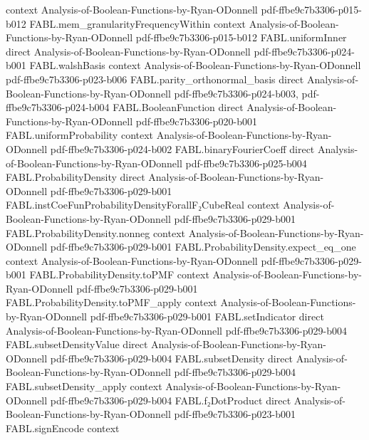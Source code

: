 \begin{theorem}
  {context}
  {Analysis-of-Boolean-Functions-by-Ryan-ODonnell}
  {pdf-ffbe9c7b3306-p015-b012}
\proofstep
  {FABL.mem_granularityFrequencyWithin}
  {context}
  {Analysis-of-Boolean-Functions-by-Ryan-ODonnell}
  {pdf-ffbe9c7b3306-p015-b012}
\proofstep
  {FABL.uniformInner}
  {direct}
  {Analysis-of-Boolean-Functions-by-Ryan-ODonnell}
  {pdf-ffbe9c7b3306-p024-b001}
\proofstep
  {FABL.walshBasis}
  {context}
  {Analysis-of-Boolean-Functions-by-Ryan-ODonnell}
  {pdf-ffbe9c7b3306-p023-b006}
\proofstep
  {FABL.parity_orthonormal_basis}
  {direct}
  {Analysis-of-Boolean-Functions-by-Ryan-ODonnell}
  {pdf-ffbe9c7b3306-p024-b003,
    pdf-ffbe9c7b3306-p024-b004}
\proofstep
  {FABL.BooleanFunction}
  {direct}
  {Analysis-of-Boolean-Functions-by-Ryan-ODonnell}
  {pdf-ffbe9c7b3306-p020-b001}
\proofstep
  {FABL.uniformProbability}
  {context}
  {Analysis-of-Boolean-Functions-by-Ryan-ODonnell}
  {pdf-ffbe9c7b3306-p024-b002}
\proofstep
  {FABL.binaryFourierCoeff}
  {direct}
  {Analysis-of-Boolean-Functions-by-Ryan-ODonnell}
  {pdf-ffbe9c7b3306-p025-b004}
\proofstep
  {FABL.ProbabilityDensity}
  {direct}
  {Analysis-of-Boolean-Functions-by-Ryan-ODonnell}
  {pdf-ffbe9c7b3306-p029-b001}
\proofstep
  {FABL.instCoeFunProbabilityDensityForallF₂CubeReal}
  {context}
  {Analysis-of-Boolean-Functions-by-Ryan-ODonnell}
  {pdf-ffbe9c7b3306-p029-b001}
\proofstep
  {FABL.ProbabilityDensity.nonneg}
  {context}
  {Analysis-of-Boolean-Functions-by-Ryan-ODonnell}
  {pdf-ffbe9c7b3306-p029-b001}
\proofstep
  {FABL.ProbabilityDensity.expect_eq_one}
  {context}
  {Analysis-of-Boolean-Functions-by-Ryan-ODonnell}
  {pdf-ffbe9c7b3306-p029-b001}
\proofstep
  {FABL.ProbabilityDensity.toPMF}
  {context}
  {Analysis-of-Boolean-Functions-by-Ryan-ODonnell}
  {pdf-ffbe9c7b3306-p029-b001}
\proofstep
  {FABL.ProbabilityDensity.toPMF_apply}
  {context}
  {Analysis-of-Boolean-Functions-by-Ryan-ODonnell}
  {pdf-ffbe9c7b3306-p029-b001}
\proofstep
  {FABL.setIndicator}
  {direct}
  {Analysis-of-Boolean-Functions-by-Ryan-ODonnell}
  {pdf-ffbe9c7b3306-p029-b004}
\proofstep
  {FABL.subsetDensityValue}
  {direct}
  {Analysis-of-Boolean-Functions-by-Ryan-ODonnell}
  {pdf-ffbe9c7b3306-p029-b004}
\proofstep
  {FABL.subsetDensity}
  {direct}
  {Analysis-of-Boolean-Functions-by-Ryan-ODonnell}
  {pdf-ffbe9c7b3306-p029-b004}
\proofstep
  {FABL.subsetDensity_apply}
  {context}
  {Analysis-of-Boolean-Functions-by-Ryan-ODonnell}
  {pdf-ffbe9c7b3306-p029-b004}
\proofstep
  {FABL.f₂DotProduct}
  {direct}
  {Analysis-of-Boolean-Functions-by-Ryan-ODonnell}
  {pdf-ffbe9c7b3306-p023-b001}
\proofstep
  {FABL.signEncode}
  {context}

\end{theorem}
